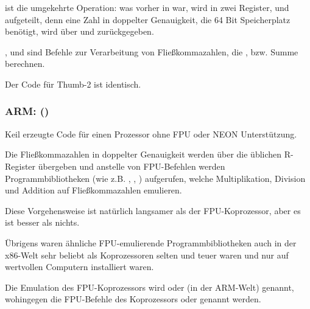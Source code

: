  ist die umgekehrte Operation: was vorher in 
war, wird in zwei Register,  und  aufgeteilt, denn eine Zahl in
doppelter Genauigkeit, die 64 Bit Speicherplatz benötigt, wird über  und
 zurückgegeben.

,  und  sind Befehle zur Verarbeitung von
Fließkommazahlen, die ,  bzw. Summe berechnen.

Der Code für Thumb-2 ist identisch.

\subsubsection{ARM: \OptimizingKeilVI (\ThumbMode)}



Keil erzeugte Code für einen Prozessor ohne FPU oder NEON Unterstützung.

Die Fließkommazahlen in doppelter Genauigkeit werden über die üblichen
R-Register übergeben und anstelle von FPU-Befehlen werden Programmbibliotheken
(wie z.B. , , )
aufgerufen, welche Multiplikation, Division und Addition auf Fließkommazahlen
emulieren. 

Diese Vorgehensweise ist natürlich langsamer als der FPU-Koprozessor, aber es
ist besser als nichts.

Übrigens waren ähnliche FPU-emulierende Programmbibliotheken auch in der
x86-Welt sehr beliebt als Koprozessoren selten und teuer waren und nur auf
wertvollen Computern installiert waren.

Die Emulation des FPU-Koprozessors wird  oder  (in der
ARM-Welt) genannt, wohingegen die FPU-Befehle des Koprozessors 
oder  genannt werden.

\iffalse
\myindex{Raspberry Pi}
Der Linux Kernel des Raspberry Pi beispielsweise wird in zwei Varianten
kompiliert.

Im Falle von \IT{soft float} werden Parameter über R-Register übergeben und im
Falle von \IT{hard float} über D-Register.

Diese Tatsache hält einen davon ab armhf-Programmbibliotheken für armel-Code
oder umgekehrt zu verwenden und dies ist der Grund warum der gesamte Code in
Linux-Distributionen speziell für eine der beiden Konventionen kompiliert wird.
\fi

